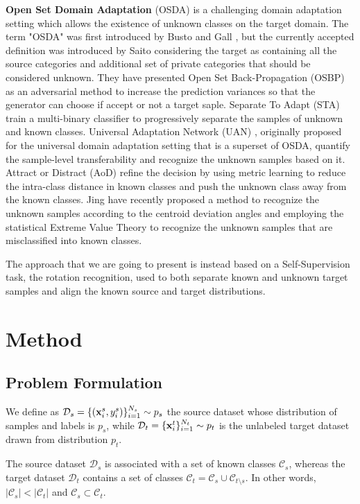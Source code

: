 \documentclass[10pt,twocolumn,letterpaper]{article}
\begin{document}
\textbf{Open Set Domain Adaptation} (OSDA) is a challenging domain adaptation 
setting which allows the existence of unknown classes on the target domain.
The term "OSDA" was first introduced by Busto and Gall \cite{firstosda}, but the 
currently accepted definition was introduced by Saito \etal \cite{saito2018open} considering the target as 
containing all the source categories and additional set of private categories 
that should be considered unknown. They have presented Open Set
Back-Propagation (OSBP) \cite{saito2018open} as an adversarial method 
to increase the prediction variances so that the generator can choose if accept or not a target saple.
Separate To Adapt (STA) \cite{sat} train a multi-binary classifier to progressively 
separate the samples of unknown and known classes.
Universal Adaptation Network (UAN) \cite{uan}, originally proposed for the universal 
domain adaptation setting that is a superset of OSDA, quantify the sample-level 
transferability and recognize the unknown samples based on it.
Attract or Distract (AoD) \cite{feng2019attract} refine the decision by using 
metric learning to reduce the intra-class distance in known classes and push 
the unknown class away from the known classes.
Jing \etal \cite{Jing_Li_Zhu_Ding_Lu_Yang_2021} have recently proposed a method
to recognize the unknown samples according to the centroid deviation angles and
employing the statistical Extreme Value Theory to recognize the unknown 
samples that are misclassified into known classes.

The approach that we are going to present is instead based on a Self-Supervision 
task, the rotation recognition, used to both separate known and unknown target 
samples and align the known source and target distributions.

\section{Method}
\label{sec:method}

\subsection{Problem Formulation}
\label{sec:problemformulation}
We define as $\mathcal{D}_s = \{({\bf x}_i^s, y_i^s)\}_{i=1}^{N_s} \sim p_s$ the source dataset whose distribution of samples and labels is $p_s$,
while $\mathcal{D}_t = \{{\bf x}_i^t\}_{i=1}^{N_t} \sim p_t$ is the unlabeled target dataset drawn from distribution $p_t$. 

The source dataset $\mathcal{D}_s$ is associated with a set of known classes $\mathcal{C}_s$,
whereas the target dataset $\mathcal{D}_t$ contains a set of classes $\mathcal{C}_t = \mathcal{C}_s \cup \mathcal{C}_{t \setminus s}$.
In other words,
$|\mathcal{C}_s| < |\mathcal{C}_t|$ and $\mathcal{C}_s \subset \mathcal{C}_t$. 
\end{document}

